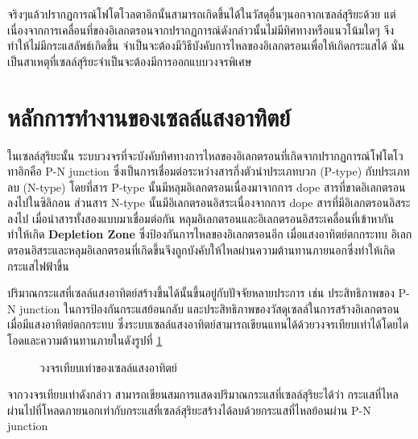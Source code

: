 \documentclass[a4paper,nobib,openany,10pt]{tufte-book}
\begin{document}
จริงๆแล้วปรากฏการณ์โฟโตโวลตาอิกนั้นสามารถเกิดขึ้นได้ในวัสดุอื่นๆนอกจากเซลล์สุริยะด้วย
แต่เนื่องจากการเคลื่อนที่ของอิเลกตรอนจากปรากฏการณ์ดังกล่าวนั้นไม่มีทิศทางหรือแนวโน้มใดๆ
จึงทำให้ไม่มีกระแสลัพธ์เกิดขึ้น
จำเป็นจะต้องมีวิธีบังคับการไหลของอิเลกตรอนเพื่อให้เกิดกระแสได้
นั่นเป็นสาเหตุที่เซลล์สุริยะจำเป็นจะต้องมีการออกแบบวงจรพิเศษ

\section{หลักการทำงานของเซลล์แสงอาทิตย์}
\label{sec:org7c44bd9}
ในเซลล์สุริยะนั้น
ระบบวงจรที่จะบังคับทิศทางการไหลของอิเลกตรอนที่เกิดจากปรากฏการณ์โฟโตโวทาอิกคือ
P-N junction ซึ่งเป็นการเชื่อมต่อระหว่างสารกึ่งตัวนำประเภทบวก (P-type)
กับประเภทลบ (N-type) โดยที่สาร P-type นั้นมีหลุมอิเลกตรอนเนื่องมาจากการ
dope สารที่ขาดอิเลกตรอนลงไปในซิลิกอน ส่วนสาร N-type
นั้นมีอิเลกตรอนอิสระเนื่องจากการ dope สารที่มีอิเลกตรอนอิสระลงไป
เมื่อนำสารทั้งสองแบบมาเชื่อมต่อกัน
หลุมอิเลกตรอนและอิเลกตรอนอิสระเคลื่อนที่เข้าหากันทำให้เกิด \textbf{Depletion
Zone} ซึ่งป้องกันการไหลของอิเลกตรอนอีก เมื่อแสงอาทิตย์ตกกระทบ
อิเลกตรอนอิสระและหลุมอิเลกตรอนที่เกิดขึ้นจึงถูกบังคับให้ไหลผ่านความต้านทานภายนอกซึ่งทำให้เกิดกระแสไฟฟ้าขึ้น

ปริมาณกระแสที่เซลล์แสงอาทิตย์สร้างขึ้นได้นั้นขึ้นอยู่กับปัจจัยหลายประการ
เช่น ประสิทธิภาพของ P-N junction ในการป้องกันกระแสย้อนกลับ
และประสิทธิภาพของวัสดุเซลล์ในการสร้างอิเลกตรอนเมื่อมีแสงอาทิตย์ตกกระทบ
ซึ่งระบบเซลล์แสงอาทิตย์สามารถเขียนแทนได้ด้วยวงจรเทียบเท่าได้โดยไดโอดและความต้านทานภายในดังรูปที่ \ref{fig: equiv circuit solar cell}


\begin{figure}[h]
  \centering
\caption{\label{fig: equiv circuit solar cell}วงจรเทียบเท่าของเซลล์แสงอาทิตย์}
\end{figure}

จากวงจรเทียบเท่าดังกล่าว
สามารถเขียนสมการแสดงปริมาณกระแสที่เซลล์สุริยะได้ว่า
กระแสที่ไหลผ่านไปที่โหลดภายนอกเท่ากับกระแสที่เซลล์สุริยะสร้างได้ลบด้วยกระแสที่ไหลย้อนผ่าน
P-N junction
\end{document}
